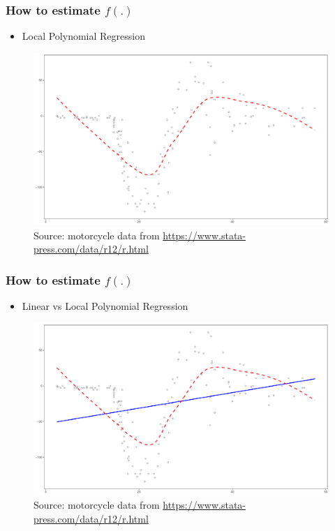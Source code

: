 \documentclass[
  shownotes,
  xcolor={svgnames},
  hyperref={colorlinks,citecolor=DarkBlue,linkcolor=DarkRed,urlcolor=DarkBlue}
  ]{beamer}
\begin{document}
\begin{frame}
\frametitle{How to estimate $f(.)$}


\begin{itemize}
  \item Local Polynomial Regression
\end{itemize}

\begin{figure}[H] \centering
  \centering
  \includegraphics[scale=0.25]{figures/fig_1c.pdf}
  \\
  \tiny
  Source: motorcycle data from \url{https://www.stata-press.com/data/r12/r.html}
\end{figure}

\end{frame}


\begin{frame}
\frametitle{How to estimate $f(.)$}


\begin{itemize}
  \item Linear vs Local Polynomial Regression
\end{itemize}

\begin{figure}[H] \centering
  \centering
  \includegraphics[scale=0.25]{figures/fig_1d.pdf}
  \\
  \tiny
  Source: motorcycle data from \url{https://www.stata-press.com/data/r12/r.html}
\end{figure}


\end{frame}
\end{document}

